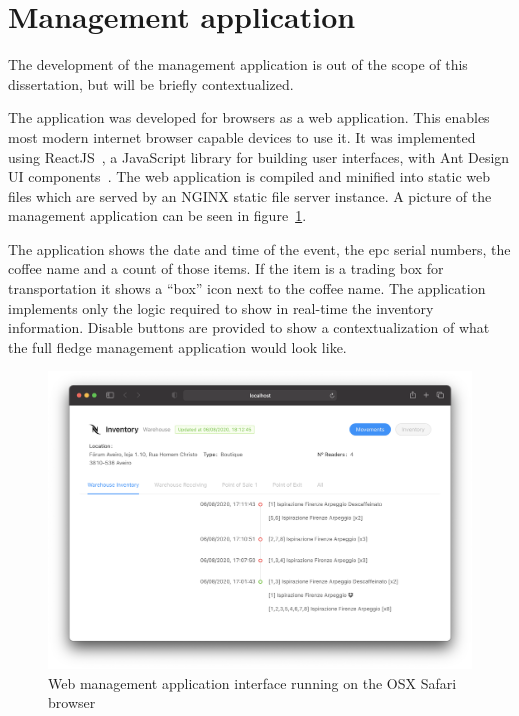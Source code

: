 \section{Management application}

The development of the management application is out of the scope of this dissertation, but will be briefly contextualized.

The application was developed for browsers as a web application. This enables most modern internet browser capable devices to use it.
It was implemented using ReactJS~\cite{ReactJavaScriptLibrary}, a JavaScript library for building user interfaces, with Ant Design UI components~\cite{AntDesignWorld}. The web application is compiled and minified into static web files which are served by an NGINX static file server instance.
A picture of the management application can be seen in figure~\ref{fig:webinterface}.

The application shows the date and time of the event, the \ac{epc} serial numbers, the coffee name and a count of those items. If the item is a trading box for transportation it shows a ``box'' icon next to the coffee name.
The application implements only the logic required to show in real-time the inventory information. Disable buttons are provided to show a contextualization of what the full fledge management application would look like.

\begin{figure}[h]
  \centering
  \includegraphics[width=\textwidth]{figs/webmanagement.png}
  \caption{Web management application interface running on the OSX Safari browser}
  \label{fig:webinterface}
\end{figure}